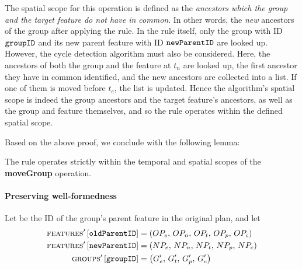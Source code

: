   The spatial scope for this operation is defined as the \emph{ancestors which the group and the target feature do not have in common}. In other words, the \emph{new} ancestors of the group after applying the rule. In the rule itself, only the group with ID $\texttt{groupID}$ and its new parent feature with ID $\texttt{newParentID}$ are looked up. However, the cycle detection algorithm must also be considered. Here, the ancestors of both the group and the feature at $t_n$ are looked up, the first ancestor they have in common identified, and the new ancestors are collected into a list. If one of them is moved before $t_e$, the list is updated. Hence the algorithm's spatial scope is indeed the group ancestors and the target feature's ancestors, as well as the group and feature themselves, and so the rule operates within the defined spatial scope.

Based on the above proof, we conclude with the following lemma:
\\

\begin{lemma}
   The  rule operates strictly within the temporal and spatial scopes of the \textbf{moveGroup} operation.
   \label{lemma:move-group-scope}
\end{lemma}

\paragraph{Preserving well-formedness}
Let  be the ID of the group's parent feature in the original plan, and let
\begin{align*}
   \textsc{features}' \left[ \texttt{oldParentID} \right] &= \left(OP_e,\, OP_n,\, OP_t,\, OP_p,\, OP_c\right) \\
   \textsc{features}' \left[ \texttt{newParentID} \right] &= \left(NP_e,\, NP_n,\, NP_t,\, NP_p,\, NP_c\right) \\
   \textsc{groups}{}' \left[ \texttt{groupID} \right] &= \left(G'_e,\, G'_t,\, G'_p,\, G'_c\right)
\end{align*}

